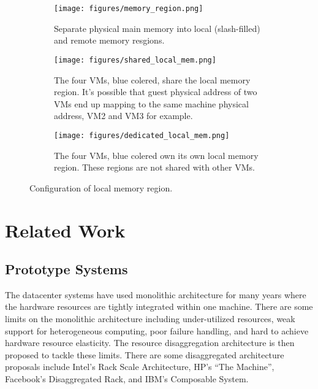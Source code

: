 \documentclass[twocolumn]{article}
\begin{document}
\begin{figure*}[h!]
     \centering
     \captionsetup[subfigure]{position=b}
     \begin{subfigure}[b]{\textwidth}
         \texttt{[image: figures/memory\_region.png]}
         \caption{Separate physical main memory into local (slash-filled) and remote memory resgions.}
         \label{fig:local memory regions}
     \end{subfigure}
     \hfill
     \begin{subfigure}[b]{\textwidth}
         \texttt{[image: figures/shared\_local\_mem.png]}
         \caption{The four VMs, blue colered, share the local memory region. It's possible that guest physical address of two VMs end up mapping to the same machine physical address, VM2 and VM3 for example.}
         \label{fig:shared local memory}
     \end{subfigure}
     \hfill
     \begin{subfigure}[b]{\textwidth}
         \texttt{[image: figures/dedicated\_local\_mem.png]}
         \caption{The four VMs, blue colered own its own local memory region. These regions are not shared with other VMs.}
         \label{fig:dedicated local memory}
     \end{subfigure}
     \caption{Configuration of local memory region.}
     \label{fig:local memory architecture}
\end{figure*}

\section{Related Work}

\subsection{Prototype Systems}
The datacenter systems have used monolithic architecture for many years where the hardware resources are tightly integrated within one machine. There are some limits on the monolithic architecture including under-utilized resources, weak support for heterogeneous computing, poor failure handling, and hard to achieve hardware resource elasticity. The resource disaggregation architecture is then proposed to tackle these limits. There are some disaggregated architecture proposals include Intel’s Rack Scale Architecture\cite{Intel_RSA}, HP’s “The Machine”\cite{HP_The_Machine}, Facebook’s Disaggregated Rack\cite{FB_disaggregated_rack}, and IBM’s Composable System\cite{IBM_composable_system}.
\end{document}
